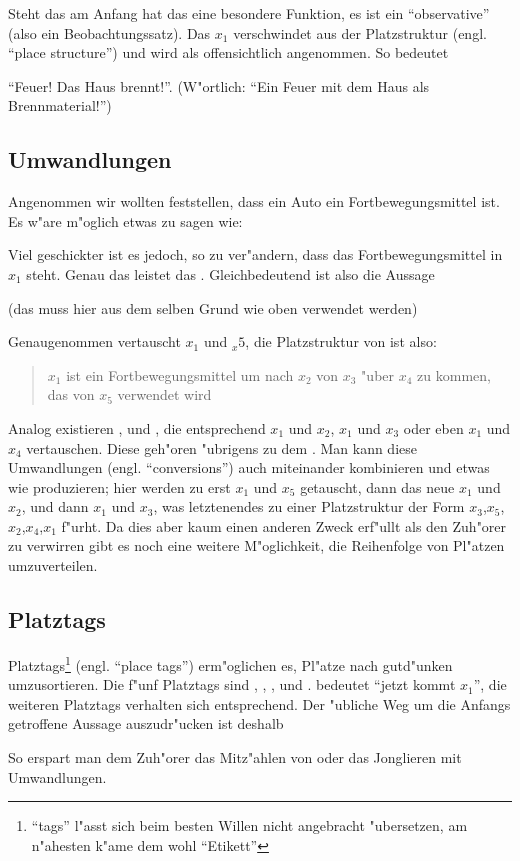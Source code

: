 Steht das  am Anfang hat das  eine besondere Funktion, es ist ein ``observative'' (also ein Beobachtungssatz). Das $x_1$ verschwindet aus der Platzstruktur
(engl. ``place structure'') und wird als offensichtlich angenommen. So bedeutet
\begin{quote}
\end{quote}
``Feuer! Das Haus brennt!''. (W"ortlich: ``Ein Feuer mit dem Haus als Brennmaterial!'')

\subsection{Umwandlungen}
Angenommen wir wollten feststellen, dass ein Auto ein Fortbewegungsmittel ist. Es w"are m"oglich etwas zu sagen wie:
\begin{quote}
\end{quote}
Viel geschickter ist es jedoch,  so zu ver"andern, dass das Fortbewegungsmittel in $x_1$ steht. Genau das leistet das  .
Gleichbedeutend ist also die Aussage
\begin{quote}
\end{quote}
(das  muss hier aus dem selben Grund wie oben verwendet werden)

Genaugenommen vertauscht  $x_1$ und $_x5$, die Platzstruktur von  ist also:
\begin{quote}
$x_1$ ist ein Fortbewegungsmittel um nach $x_2$ von $x_3$ "uber $x_4$ zu kommen, das von $x_5$ verwendet wird
\end{quote}

Analog existieren ,  und , die entsprechend $x_1$ und $x_2$, $x_1$ und $x_3$ oder eben $x_1$ und $x_4$ vertauschen. Diese  geh"oren "ubrigens
zu dem  .
Man kann diese Umwandlungen (engl. ``conversions'') auch miteinander kombinieren und etwas wie  produzieren; hier werden zu erst $x_1$ und $x_5$ getauscht, dann
das neue $x_1$ und $x_2$, und dann $x_1$ und $x_3$, was letztenendes zu einer Platzstruktur der Form $x_3$,$x_5$,$x_2$,$x_4$,$x_1$ f"urht.
Da dies aber kaum einen anderen Zweck erf"ullt als den Zuh"orer zu verwirren gibt es noch eine weitere M"oglichkeit, die Reihenfolge von Pl"atzen umzuverteilen.

\subsection{Platztags}
Platztags\footnote{``tags'' l"asst sich beim besten Willen nicht angebracht "ubersetzen, am n"ahesten k"ame dem wohl ``Etikett''} (engl. ``place tags'') erm"oglichen es, Pl"atze
nach gutd"unken umzusortieren. Die f"unf Platztags sind , , ,  und .  bedeutet ``jetzt kommt $x_1$'', die weiteren Platztags 
verhalten sich entsprechend.
Der "ubliche Weg um die Anfangs getroffene Aussage auszudr"ucken ist deshalb
\begin{quote}
\end{quote}
So erspart man dem Zuh"orer das Mitz"ahlen von  oder das Jonglieren mit Umwandlungen.
